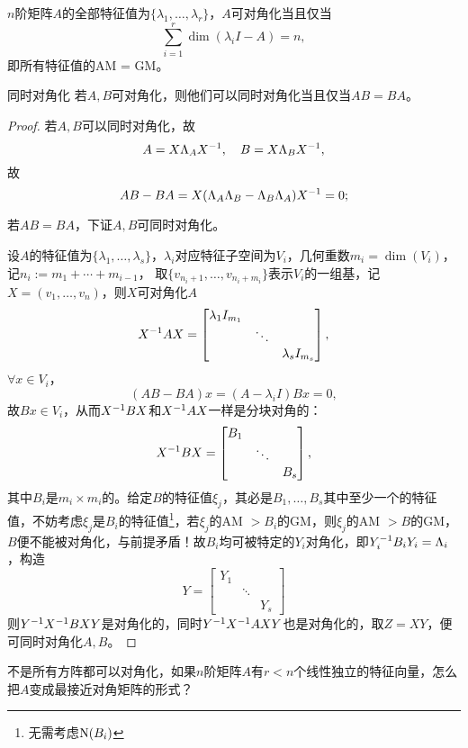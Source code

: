 \begin{corollary}
	$n$阶矩阵$A$的全部特征值为$\{\lambda_1,\ldots,\lambda_r\}$，$A$可对角化当且仅当
	\[
		\sum_{i=1}^r\dim(\lambda_iI-A)=n,
	\]
	即所有特征值的AM = GM。
\end{corollary}
\begin{theorem}{同时对角化}{}
	若$A,B$可对角化，则他们可以同时对角化当且仅当$AB=BA$。
\end{theorem}
\begin{proof}
	若$A,B$可以同时对角化，故
	\[
		A=X\Lambda_AX^{-1},\quad B=X\Lambda_BX^{-1},
	\]
	故
	\[
		AB-BA=X(\Lambda_A\Lambda_B-\Lambda_B\Lambda_A)X^{-1}=0;
	\]
	
	若$AB=BA$，下证$A,B$可同时对角化。
	
	设$A$的特征值为$\{\lambda_1,\ldots,\lambda_s\}$，$\lambda_i$对应特征子空间为$V_i$，几何重数$m_i=\dim(V_i)$，%
	记$n_i:=m_1+\cdots+m_{i-1}$，
	取$\{v_{n_i+1},\ldots,v_{n_i+m_i}\}$表示$V_i$的一组基，记$X=(v_1,\ldots,v_n)$，则$X$可对角化$A$
	\[
		X^{-1} AX=\begin{bmatrix}
			\lambda_1I_{m_1}\\ &\ddots\\ &&\lambda_sI_{m_s}
		\end{bmatrix},
	\]
	$\forall x\in V_i$，
	\[
		(AB-BA)x=(A-\lambda_iI)Bx=0,
	\]
	故$Bx\in V_i$，从而$X^{-1} BX$和$X^{-1} AX$一样是分块对角的：
	\[
		X^{-1} BX=\begin{bmatrix}
			B_1\\ &\ddots\\ &&B_s
		\end{bmatrix},
	\]
	其中$B_i$是$m_i\times m_i$的。给定$B$的特征值$\xi_j$，其必是$B_1,\ldots,B_s$其中至少一个的特征值，不妨考虑$\xi_j$是$B_i$的特征值\footnote{无需考虑$\operatorname{N}(B_i)$}，若$\xi_j$的AM $>B_i$的GM，则$\xi_j$的AM $>B$的GM，$B$便不能被对角化，与前提矛盾！故$B_i$均可被特定的$Y_i$对角化，即$Y_i^{-1} B_iY_i=\Lambda_i$，构造
	\[
		Y=\begin{bmatrix}
			Y_1\\ &\ddots\\ &&Y_s
		\end{bmatrix}
	\]
	则$Y^{-1} X^{-1} BXY$是对角化的，同时$Y^{-1} X^{-1} AXY$也是对角化的，取$Z=XY$，便可同时对角化$A,B$。
\end{proof}
不是所有方阵都可以对角化，如果$n$阶矩阵$A$有$r<n$个线性独立的特征向量，怎么把$A$变成最接近对角矩阵的形式？


